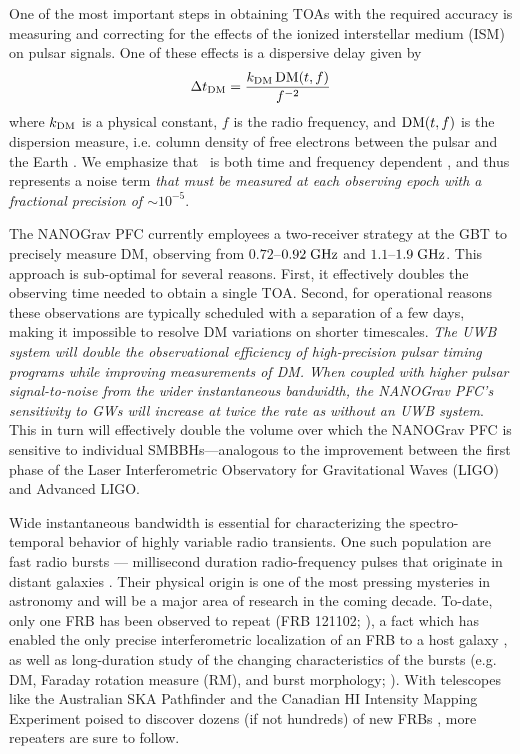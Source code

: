 \documentclass[10pt]{myNSF}
\begin{document}
One of the most important steps in obtaining TOAs with the required
accuracy is measuring and correcting for the effects of the ionized
interstellar medium (ISM) on pulsar signals.  One of these effects is
a dispersive delay given by
\begin{equation}
  \Delta t_{\rm DM} = \frac{k_{\rm DM} \, \textrm{DM}(t,f)}{f^{-2}}
\end{equation}
where $k_{\rm DM}$ is a physical constant, $f$ is the radio frequency,
and $\textrm{DM}(t,f)$ is the dispersion measure, i.e. column density of free
electrons between the pulsar and the Earth \citep[e.g.][]{lk12}.  We
emphasize that \DM\ is both time and frequency dependent
\citep{css16}, and thus represents a noise term \emph{that must be
  measured at each observing epoch with a fractional precision of
  $\sim 10^{-5}$}.

The NANOGrav PFC currently employees a two-receiver strategy at the
GBT to precisely measure DM, observing from $0.72$--$0.92\; \textrm{GHz}$ and
$1.1$--$1.9\; \textrm{GHz}$.  This approach is sub-optimal for several
reasons.  First, it effectively doubles the observing time needed to
obtain a single TOA.  Second, for operational reasons these
observations are typically scheduled with a separation of a few days,
making it impossible to resolve DM variations on shorter timescales.
\emph{The UWB system will double the observational efficiency of
  high-precision pulsar timing programs while improving measurements
  of DM.  When coupled with higher pulsar signal-to-noise from the
  wider instantaneous bandwidth, the NANOGrav PFC's sensitivity to GWs
  will increase at twice the rate as without an UWB system}.  This in
turn will effectively double the volume over which the NANOGrav PFC is
sensitive to individual SMBBHs---analogous to the improvement between
the first phase of the Laser Interferometric Observatory for
Gravitational Waves (LIGO) and Advanced LIGO.

 Wide instantaneous bandwidth is
essential for characterizing the spectro-temporal behavior of highly
variable radio transients.  One such population are fast radio bursts
--- millisecond duration radio-frequency pulses that originate in
distant galaxies \citep{lbm+07,tsb+13}.  Their physical origin is one
of the most pressing mysteries in astronomy and will be a major area
of research in the coming decade.  To-date, only one FRB has been
observed to repeat (FRB 121102; \cite{sch+14,ssh+16a}), a fact which
has enabled the only precise interferometric localization of an FRB to
a host galaxy \citep{clw+17,tbc+17}, as well as long-duration study of
the changing characteristics of the bursts (e.g. DM, Faraday rotation
measure (RM), and burst morphology; \cite{msh+18}).  With telescopes
like the Australian SKA Pathfinder and the Canadian HI Intensity
Mapping Experiment poised to discover dozens (if not hundreds) of new
FRBs \citep{smb+18,chime18}, more repeaters are sure to follow.
\end{document}
